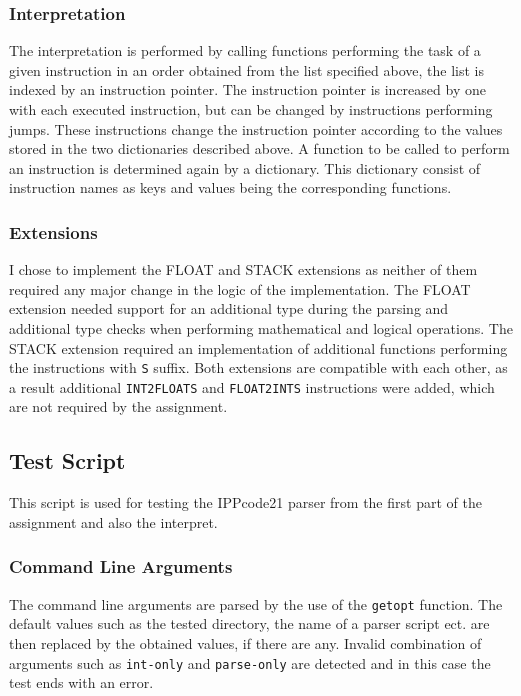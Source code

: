 \documentclass[10pt]{article}
\begin{document}
\subsubsection*{Interpretation}
The interpretation is performed by calling functions performing the task of a given instruction in an order obtained from the list specified above, the list is indexed by an instruction pointer. The instruction pointer is increased by one with each executed instruction, but can be changed by instructions performing jumps. These instructions change the instruction pointer according to the values stored in the two dictionaries described above. A function to be called to perform an instruction is determined again by a dictionary. This dictionary consist of instruction names as keys and values being the corresponding functions.

\subsubsection*{Extensions}
I chose to implement the FLOAT and STACK extensions as neither of them required any major change in the logic of the implementation. The FLOAT extension needed support for an additional type during the parsing and additional type checks when performing mathematical and logical operations. The STACK extension required an implementation of additional functions performing the instructions with \texttt{S} suffix. Both extensions are compatible with each other, as a result additional \texttt{INT2FLOATS} and \texttt{FLOAT2INTS} instructions were added, which are not required by the assignment.

\newpage

\subsection*{Test Script}
This script is used for testing the IPPcode21 parser from the first part of the assignment and also the interpret.

\subsubsection*{Command Line Arguments}
The command line arguments are parsed by the use of the \texttt{getopt} function. The default values such as the tested directory, the name of a parser script ect. are then replaced by the obtained values, if there are any. Invalid combination of arguments such as \texttt{int-only} and \texttt{parse-only} are detected and in this case the test ends with an error.
\end{document}
